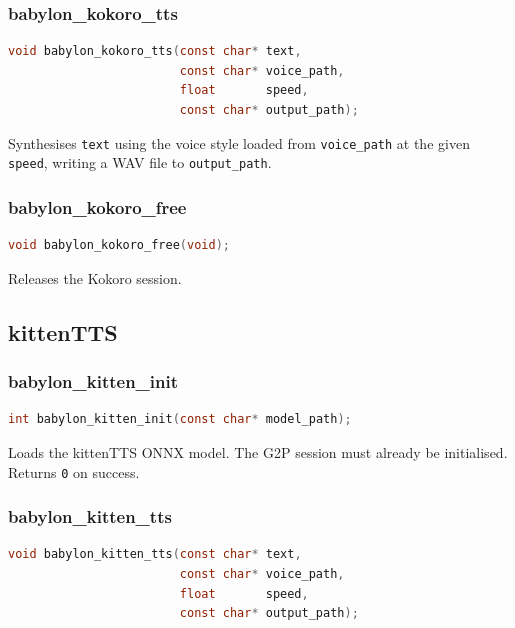 \documentclass[12pt,a4paper]{article}
\begin{document}
\subsubsection{babylon\_kokoro\_tts}

\begin{lstlisting}[language=c]
void babylon_kokoro_tts(const char* text,
                        const char* voice_path,
                        float       speed,
                        const char* output_path);
\end{lstlisting}

Synthesises \texttt{text} using the voice style loaded from \texttt{voice\_path} at the given \texttt{speed}, writing a WAV file to \texttt{output\_path}.

\subsubsection{babylon\_kokoro\_free}

\begin{lstlisting}[language=c]
void babylon_kokoro_free(void);
\end{lstlisting}

Releases the Kokoro session.

\subsection{kittenTTS}

\subsubsection{babylon\_kitten\_init}

\begin{lstlisting}[language=c]
int babylon_kitten_init(const char* model_path);
\end{lstlisting}

Loads the kittenTTS ONNX model. The G2P session must already be initialised. Returns \texttt{0} on success.

\subsubsection{babylon\_kitten\_tts}

\begin{lstlisting}[language=c]
void babylon_kitten_tts(const char* text,
                        const char* voice_path,
                        float       speed,
                        const char* output_path);
\end{lstlisting}
\end{document}
